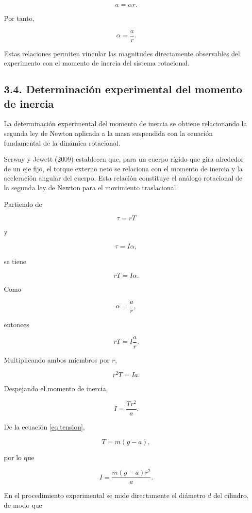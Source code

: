 \documentclass[11pt,a4paper]{article}
\begin{document}
\[
a=\alpha r.
\]

Por tanto,

\[
\alpha=\frac{a}{r}.
\]

Estas relaciones permiten vincular las magnitudes directamente observables
del experimento con el momento de inercia del sistema rotacional.



\subsection*{3.4. Determinación experimental del momento de inercia}

La determinación experimental del momento de inercia se obtiene relacionando
la segunda ley de Newton aplicada a la masa suspendida con la ecuación
fundamental de la dinámica rotacional.

Serway y Jewett (2009) establecen que, para un cuerpo rígido que gira
alrededor de un eje fijo, el torque externo neto se relaciona con el
momento de inercia y la aceleración angular del cuerpo. Esta relación
constituye el análogo rotacional de la segunda ley de Newton para el
movimiento traslacional.

Partiendo de

\[
\tau=rT
\]

y

\[
\tau=I\alpha,
\]

se tiene

\[
rT=I\alpha.
\]

Como

\[
\alpha=\frac{a}{r},
\]

entonces

\[
rT=I\frac{a}{r}.
\]

Multiplicando ambos miembros por \(r\),

\[
r^2T=Ia.
\]

Despejando el momento de inercia,

\[
I=\frac{Tr^2}{a}.
\]

De la ecuación \eqref{eq:tension},

\[
T=m(g-a),
\]

por lo que

\[
I=
\frac{m(g-a)r^2}{a}.
\]

En el procedimiento experimental se mide directamente el diámetro \(d\)
del cilindro, de modo que
\end{document}

